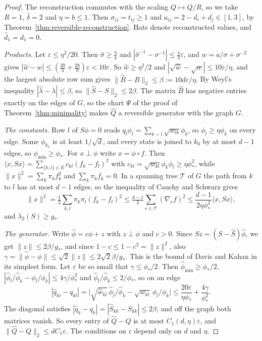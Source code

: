 \begin{proof}
The reconstruction commutes with the scaling $Q\mapsto Q/R$, so we take $R=1$,
$\bar\delta=2$ and $\eta=b\le1$. Then $\sigma_{ij}=t_{ij}\ge1$ and
$a_{ij}=2-d_i+d_j\in[1,3]$, by Theorem~\ref{thm:reversible-reconstruction}. Hats
denote reconstructed values, and $\widehat d_1=d_1=0$.

\emph{Products.} Let $\varepsilon\le\eta^2/20$. Then $\widehat\sigma\ge\frac34$
and $|\widehat\sigma^{-1}-\sigma^{-1}|\le\frac43\varepsilon$, and
$w=a/\sigma+\sigma^{-2}$ gives
$|\widehat w-w|\le(\frac{20}3+\frac{28}9)\varepsilon<10\varepsilon$. So
$\widehat w\ge\eta^2/2$ and $|\sqrt{\widehat w}-\sqrt w|\le10\varepsilon/\eta$,
and the largest absolute row sum gives
$\|\widehat B-B\|_2\le\beta:=10d\varepsilon/\eta$. By Weyl's inequality
$|\widehat\lambda-\lambda|\le\beta$, so $\|\widehat S-S\|_2\le2\beta$. The matrix
$\widehat B$ has negative entries exactly on the edges of $G$, so the chart
$\Psi$ of the proof of Theorem~\ref{thm:minimality} makes $\widehat Q$ a
reversible generator with the graph $G$.

\emph{The constants.} Row $l$ of $S\phi=0$ reads
$q_l\phi_l=\sum_{k\sim l}\sqrt{w_{lk}}\phi_k$, so $\phi_l\ge\eta\phi_k$ on every
edge. Some $\phi_{k_0}$ is at least $1/\sqrt d$, and every state is joined to
$k_0$ by at most $d-1$ edges, so $\phi_{\min}\ge\phi_*$. For $x\perp\phi$ write
$x=\phi\circ f$. Then $\langle x,Sx\rangle=\sum_{\{k,l\}\in E}c_{kl}(f_k-f_l)^2$
with $c_{kl}=\sqrt{w_{kl}}\phi_k\phi_l\ge\eta\phi_*^2$, while
$\|x\|^2=\sum_k\pi_kf_k^2$ and $\sum_k\pi_kf_k=0$. In a spanning tree
$\mathcal T$ of $G$ the path from $k$ to $l$ has at most $d-1$ edges, so the
inequality of Cauchy and Schwarz gives
\[
 \|x\|^2=\tfrac12\sum_{k,l}\pi_k\pi_l(f_k-f_l)^2\le\tfrac{d-1}2\sum_{e\in\mathcal T}(\nabla_ef)^2
 \le\frac{d-1}{2\eta\phi_*^2}\langle x,Sx\rangle,
\]
and $\lambda_2(S)\ge g_*$.

\emph{The generator.} Write $\widehat\phi=c\phi+z$ with $z\perp\phi$ and $c>0$.
Since $Sz=(S-\widehat S)\widehat\phi$, we get $\|z\|\le2\beta/g_*$, and since
$1-c\le1-c^2=\|z\|^2$, also
$\gamma=\|\widehat\phi-\phi\|\le\sqrt2\|z\|\le2\sqrt2\beta/g_*$. This is the
bound of Davis and Kahan in its simplest form. Let $\varepsilon$ be so small
that $\gamma\le\phi_*/2$. Then $\widehat\phi_{\min}\ge\phi_*/2$,
$|\widehat\phi_l/\widehat\phi_k-\phi_l/\phi_k|\le4\gamma/\phi_*^2$ and
$\widehat\phi_l/\widehat\phi_k\le2/\phi_*$, so on an edge
\[
 |\widehat q_{kl}-q_{kl}|
 =\bigl|\sqrt{\widehat w_{kl}}\,\widehat\phi_l/\widehat\phi_k-\sqrt{w_{kl}}\,\phi_l/\phi_k\bigr|
 \le\frac{20\varepsilon}{\eta\phi_*}+\frac{4\gamma}{\phi_*^2}.
\]
The diagonal satisfies $|\widehat q_k-q_k|=|\widehat S_{kk}-S_{kk}|\le2\beta$, and
off the graph both matrices vanish. So every entry of $\widehat Q-Q$ is at most
$C_1(d,\eta)\varepsilon$, and $\|\widehat Q-Q\|_2\le dC_1\varepsilon$. The
conditions on $\varepsilon$ depend only on $d$ and $\eta$.
\end{proof}

